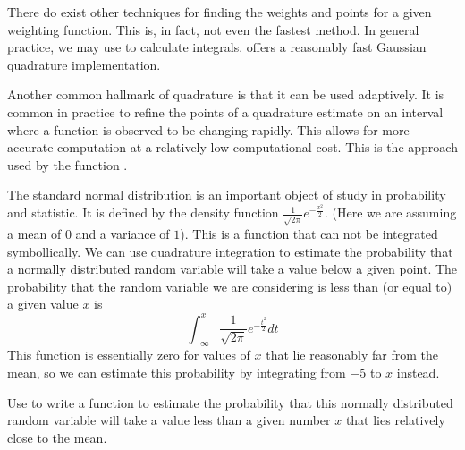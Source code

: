 
There do exist other techniques for finding the weights and points for a given weighting function.
This is, in fact, not even the fastest method.
In general practice, we may use  to calculate integrals.
 offers a reasonably fast Gaussian quadrature implementation.

Another common hallmark of quadrature is that it can be used adaptively.
It is common in practice to refine the points of a quadrature estimate on an interval where a function is observed to be changing rapidly.
This allows for more accurate computation at a relatively low computational cost.
This is the approach used by the function .

\begin{problem}
The standard normal distribution is an important object of study in probability and statistic.
It is defined by the density function $\frac{1}{\sqrt{2 \pi}} e^{- \frac{x^2}{2}}$.
(Here we are assuming a mean of $0$ and a variance of $1$).
This is a function that can not be integrated symbollically.
We can use quadrature integration to estimate the probability that a normally distributed random variable will take a value below a given point.
The probability that the random variable we are considering is less than (or equal to) a given value $x$ is
\[\int_{-\infty}^x \frac{1}{\sqrt{2 \pi}} e^{- \frac{t^2}{2}} dt\]
This function is essentially zero for values of $x$ that lie reasonably far from the mean, so we can estimate this probability by integrating from $-5$ to $x$ instead.

Use  to write a function to estimate the probability that this normally distributed random variable will take a value less than a given number $x$ that lies relatively close to the mean.
\end{problem}